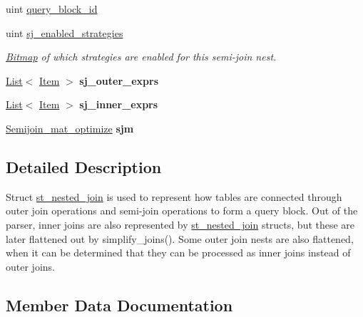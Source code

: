 \begin{DoxyCompactItemize}
\item 
uint \mbox{\hyperlink{structst__nested__join_ae77e1736a81f0c6de9df6d9953106f12}{query\+\_\+block\+\_\+id}}
\item 
\mbox{\label{structst__nested__join_ad90ac321deefbafff8e6ed847975d690}} 
uint \mbox{\hyperlink{structst__nested__join_ad90ac321deefbafff8e6ed847975d690}{sj\+\_\+enabled\+\_\+strategies}}
\begin{DoxyCompactList}\small\item\em \mbox{\hyperlink{classBitmap}{Bitmap}} of which strategies are enabled for this semi-\/join nest. \end{DoxyCompactList}\item 
\mbox{\label{structst__nested__join_a29afbf516448530d35a99d3009ed650e}} 
\mbox{\hyperlink{classList}{List}}$<$ \mbox{\hyperlink{classItem}{Item}} $>$ {\bfseries sj\+\_\+outer\+\_\+exprs}
\item 
\mbox{\label{structst__nested__join_a8bdbad374e87dcde40538aad25b39b46}} 
\mbox{\hyperlink{classList}{List}}$<$ \mbox{\hyperlink{classItem}{Item}} $>$ {\bfseries sj\+\_\+inner\+\_\+exprs}
\item 
\mbox{\label{structst__nested__join_a2919685e2cdcd0948f927354d3554698}} 
\mbox{\hyperlink{structSemijoin__mat__optimize}{Semijoin\+\_\+mat\+\_\+optimize}} {\bfseries sjm}
\end{DoxyCompactItemize}


\subsection{Detailed Description}
Struct \mbox{\hyperlink{structst__nested__join}{st\+\_\+nested\+\_\+join}} is used to represent how tables are connected through outer join operations and semi-\/join operations to form a query block. Out of the parser, inner joins are also represented by \mbox{\hyperlink{structst__nested__join}{st\+\_\+nested\+\_\+join}} structs, but these are later flattened out by simplify\+\_\+joins(). Some outer join nests are also flattened, when it can be determined that they can be processed as inner joins instead of outer joins. 

\subsection{Member Data Documentation}
\mbox{\label{structst__nested__join_a7f32cd3a7b327aac61864a68095ed66f}} 
